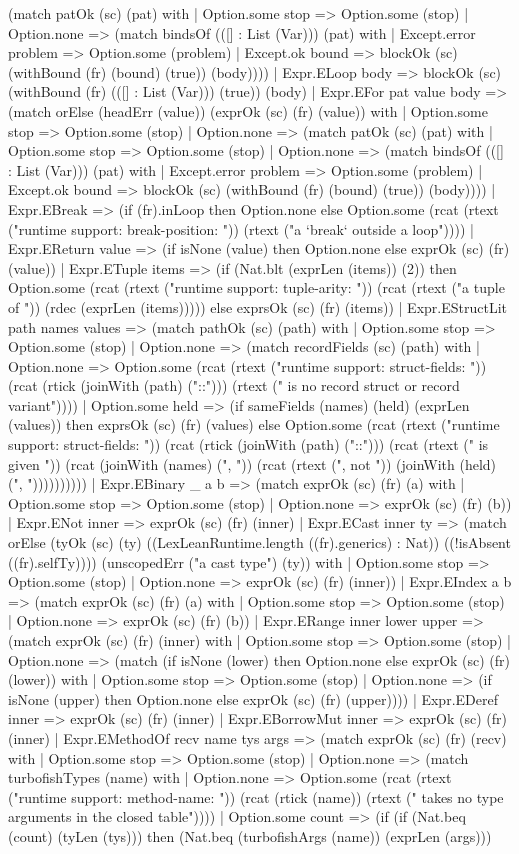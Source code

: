\documentclass[11pt]{article}
\begin{document}
(match patOk (sc) (pat) with | Option.some stop => Option.some (stop) | Option.none => (match bindsOf (([] : List (Var))) (pat) with | Except.error problem => Option.some (problem) | Except.ok bound => blockOk (sc) (withBound (fr) (bound) (true)) (body)))) | Expr.ELoop body => blockOk (sc) (withBound (fr) (([] : List (Var))) (true)) (body) | Expr.EFor pat value body => (match orElse (headErr (value)) (exprOk (sc) (fr) (value)) with | Option.some stop => Option.some (stop) | Option.none => (match patOk (sc) (pat) with | Option.some stop => Option.some (stop) | Option.none => (match bindsOf (([] : List (Var))) (pat) with | Except.error problem => Option.some (problem) | Except.ok bound => blockOk (sc) (withBound (fr) (bound) (true)) (body)))) | Expr.EBreak => (if (fr).inLoop then Option.none else Option.some (rcat (rtext ("runtime support: break-position: ")) (rtext ("a `break` outside a loop")))) | Expr.EReturn value => (if isNone (value) then Option.none else exprOk (sc) (fr) (value)) | Expr.ETuple items => (if (Nat.blt (exprLen (items)) (2)) then Option.some (rcat (rtext ("runtime support: tuple-arity: ")) (rcat (rtext ("a tuple of ")) (rdec (exprLen (items))))) else exprsOk (sc) (fr) (items)) | Expr.EStructLit path names values => (match pathOk (sc) (path) with | Option.some stop => Option.some (stop) | Option.none => (match recordFields (sc) (path) with | Option.none => Option.some (rcat (rtext ("runtime support: struct-fields: ")) (rcat (rtick (joinWith (path) ("::"))) (rtext (" is no record struct or record variant")))) | Option.some held => (if sameFields (names) (held) (exprLen (values)) then exprsOk (sc) (fr) (values) else Option.some (rcat (rtext ("runtime support: struct-fields: ")) (rcat (rtick (joinWith (path) ("::"))) (rcat (rtext (" is given ")) (rcat (joinWith (names) (", ")) (rcat (rtext (", not ")) (joinWith (held) (", ")))))))))) | Expr.EBinary \_ a b => (match exprOk (sc) (fr) (a) with | Option.some stop => Option.some (stop) | Option.none => exprOk (sc) (fr) (b)) | Expr.ENot inner => exprOk (sc) (fr) (inner) | Expr.ECast inner ty => (match orElse (tyOk (sc) (ty) ((LexLeanRuntime.length ((fr).generics) : Nat)) ((!isAbsent ((fr).selfTy)))) (unscopedErr ("a cast type") (ty)) with | Option.some stop => Option.some (stop) | Option.none => exprOk (sc) (fr) (inner)) | Expr.EIndex a b => (match exprOk (sc) (fr) (a) with | Option.some stop => Option.some (stop) | Option.none => exprOk (sc) (fr) (b)) | Expr.ERange inner lower upper => (match exprOk (sc) (fr) (inner) with | Option.some stop => Option.some (stop) | Option.none => (match (if isNone (lower) then Option.none else exprOk (sc) (fr) (lower)) with | Option.some stop => Option.some (stop) | Option.none => (if isNone (upper) then Option.none else exprOk (sc) (fr) (upper)))) | Expr.EDeref inner => exprOk (sc) (fr) (inner) | Expr.EBorrowMut inner => exprOk (sc) (fr) (inner) | Expr.EMethodOf recv name tys args => (match exprOk (sc) (fr) (recv) with | Option.some stop => Option.some (stop) | Option.none => (match turbofishTypes (name) with | Option.none => Option.some (rcat (rtext ("runtime support: method-name: ")) (rcat (rtick (name)) (rtext (" takes no type arguments in the closed table")))) | Option.some count => (if (if (Nat.beq (count) (tyLen (tys))) then (Nat.beq (turbofishArgs (name)) (exprLen (args))) 
\end{document}
